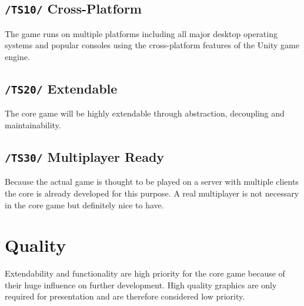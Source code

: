 \documentclass[11pt]{article}
\begin{document}
\subsection{\texttt{/TS10/} Cross-Platform}
The game runs on multiple platforms including all major desktop operating systems and popular consoles using the cross-platform features of the Unity game engine.
\subsection{\texttt{/TS20/} Extendable}
The core game will be highly extendable through abstraction, decoupling and maintainability.
\subsection{\texttt{/TS30/} Multiplayer Ready}
Because the actual game is thought to be played on a server with multiple clients the core is already developed for this purpose.
A real multiplayer is not necessary in the core game but definitely nice to have.

\section{Quality}
Extendability and functionality are high priority for the core game because of their huge influence on further development.
High quality graphics are only required for presentation and are therefore considered low priority.
\end{document}
